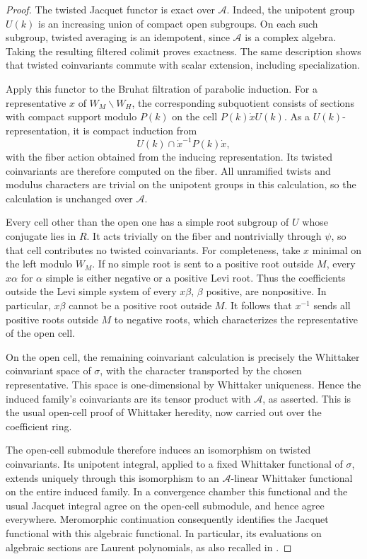 \begin{proof}
The twisted Jacquet functor is exact over $\mathcal A$.  Indeed, the
unipotent group $U(k)$ is an increasing union of compact open subgroups.
On each such subgroup, twisted averaging is an idempotent, since
$\mathcal A$ is a complex algebra.  Taking the resulting filtered
colimit proves exactness.  The same description shows that twisted
coinvariants commute with scalar extension, including specialization.

Apply this functor to the Bruhat filtration of parabolic induction.
For a representative $x$ of $W_M\backslash W_H$, the corresponding
subquotient consists of sections with compact support modulo $P(k)$
on the cell $P(k)\dot xU(k)$.  As a $U(k)$-representation, it is compact
induction from
\[
 U(k)\cap\dot x^{-1}P(k)\dot x,
\]
with the fiber action obtained from the inducing representation.
Its twisted coinvariants are therefore computed on the fiber.  All
unramified twists and modulus characters are trivial on the unipotent
groups in this calculation, so the calculation is unchanged over
$\mathcal A$.

Every cell other than the open one has a simple root subgroup of $U$
whose conjugate lies in $R$.  It acts trivially on the fiber and
nontrivially through $\psi$, so that cell contributes no twisted
coinvariants.  For completeness, take $x$ minimal on the left modulo
$W_M$.  If no simple root is sent to a positive root outside $M$, every
$x\alpha$ for $\alpha$ simple is either negative or a positive Levi
root. Thus the coefficients outside the Levi simple system of every
$x\beta$, $\beta$ positive, are nonpositive. In particular, $x\beta$
cannot be a positive root outside $M$. It follows that $x^{-1}$ sends
all positive roots outside $M$ to negative roots, which characterizes
the representative of the open cell.

On the open cell, the remaining coinvariant calculation is precisely
the Whittaker coinvariant space of $\sigma$, with the character
transported by the chosen representative.  This space is
one-dimensional by Whittaker uniqueness.  Hence the induced family's
coinvariants are its tensor product with $\mathcal A$, as asserted.
This is the usual open-cell proof of Whittaker heredity, now carried
out over the coefficient ring.

The open-cell submodule therefore induces an isomorphism on twisted
coinvariants.  Its unipotent integral, applied to a fixed Whittaker
functional of $\sigma$, extends uniquely through this isomorphism to
an $\mathcal A$-linear Whittaker functional on the entire induced
family.  In a convergence chamber this functional and the usual
Jacquet integral agree on the open-cell submodule, and hence agree
everywhere.  Meromorphic continuation consequently identifies the
Jacquet functional with this algebraic functional.  In particular,
its evaluations on algebraic sections are Laurent polynomials, as
also recalled in \cite[\S1.2]{LomeliLS}.


\end{proof}
